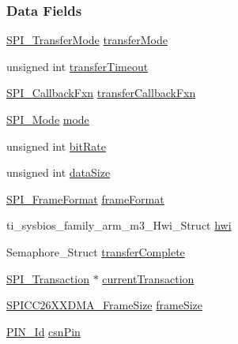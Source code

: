 \subsubsection*{Data Fields}
\begin{DoxyCompactItemize}
\item 
\hyperlink{_s_p_i_8h_ab9ea76c6529d6076eee5e1c4a5a92c6f}{S\+P\+I\+\_\+\+Transfer\+Mode} \hyperlink{struct_s_p_i_c_c26_x_x___object_ab8d46bbfaf042eb2d8d37208b0a0bb89}{transfer\+Mode}
\item 
unsigned int \hyperlink{struct_s_p_i_c_c26_x_x___object_a8ba149946ed7b4059467e8e504998482}{transfer\+Timeout}
\item 
\hyperlink{_s_p_i_8h_a207e2d5a7e7ea5606b6995b6485ca015}{S\+P\+I\+\_\+\+Callback\+Fxn} \hyperlink{struct_s_p_i_c_c26_x_x___object_ab119ec24a63c0011973978f60b9348ef}{transfer\+Callback\+Fxn}
\item 
\hyperlink{_s_p_i_8h_a60a7e3d74577b38aa79ea6983362f942}{S\+P\+I\+\_\+\+Mode} \hyperlink{struct_s_p_i_c_c26_x_x___object_ab8bed2c9dfa1520053a1b2eef32db549}{mode}
\item 
unsigned int \hyperlink{struct_s_p_i_c_c26_x_x___object_a96064f0b51ffdf29356164dbd7c614ad}{bit\+Rate}
\item 
unsigned int \hyperlink{struct_s_p_i_c_c26_x_x___object_a37480e975d427acc570778a2fbbd88d8}{data\+Size}
\item 
\hyperlink{_s_p_i_8h_a4e1f33555dfa8147205af5b266f3a489}{S\+P\+I\+\_\+\+Frame\+Format} \hyperlink{struct_s_p_i_c_c26_x_x___object_a01e584aa7d8781d93e9ce4d1e773e12a}{frame\+Format}
\item 
ti\+\_\+sysbios\+\_\+family\+\_\+arm\+\_\+m3\+\_\+\+Hwi\+\_\+\+Struct \hyperlink{struct_s_p_i_c_c26_x_x___object_a6966e1e89b770dc8d352f5cafd84ffb7}{hwi}
\item 
Semaphore\+\_\+\+Struct \hyperlink{struct_s_p_i_c_c26_x_x___object_acf8b67f6c17c97963023d624a189a76c}{transfer\+Complete}
\item 
\hyperlink{struct_s_p_i___transaction}{S\+P\+I\+\_\+\+Transaction} $\ast$ \hyperlink{struct_s_p_i_c_c26_x_x___object_a88eb8e5827da9773b6ac17fe5beaad4a}{current\+Transaction}
\item 
\hyperlink{_s_p_i_c_c26_x_x_d_m_a_8h_a1c5afb8465d3e8689a82088ad25fc81a}{S\+P\+I\+C\+C26\+X\+X\+D\+M\+A\+\_\+\+Frame\+Size} \hyperlink{struct_s_p_i_c_c26_x_x___object_a99cc8a3a78ab2d00c1b1c921eea15cd7}{frame\+Size}
\item 
\hyperlink{_p_i_n_8h_a9ae8197f460bb76ea09a84f47d09921f}{P\+I\+N\+\_\+\+Id} \hyperlink{struct_s_p_i_c_c26_x_x___object_ad61200344ad14b50cd9847e1da964454}{csn\+Pin}

\end{DoxyCompactItemize}
